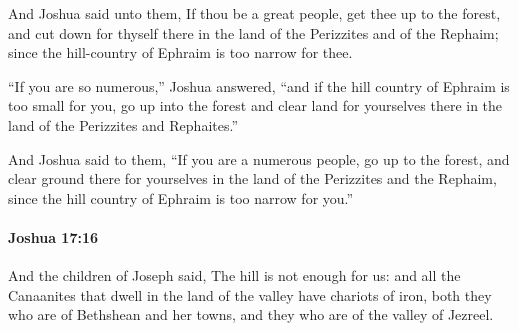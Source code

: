 			\begin{versebox}
					\item[BHS] 
					\item[ASV] And Joshua said unto them, If thou be a great people, get thee up to the forest, and cut down for thyself there in the land of the Perizzites and of the Rephaim; since the hill-country of Ephraim is too narrow for thee.
					\item[NIV] “If you are so numerous,” Joshua answered, “and if the hill country of Ephraim is too small for you, go up into the forest and clear land for yourselves there in the land of the Perizzites and Rephaites.”
					\item[NRSV] And Joshua said to them, “If you are a numerous people, go up to the forest, and clear ground there for yourselves in the land of the Perizzites and the Rephaim, since the hill country of Ephraim is too narrow for you.”
			\end{versebox}

		\paragraph{Joshua 17:16} %
			\label{JOSHUA-17-16}

			And the children of Joseph said, The hill is not enough for us: and all the Canaanites that dwell in the land of the valley have chariots of iron, both they who are of Bethshean and her towns, and they who are of the valley of Jezreel.

